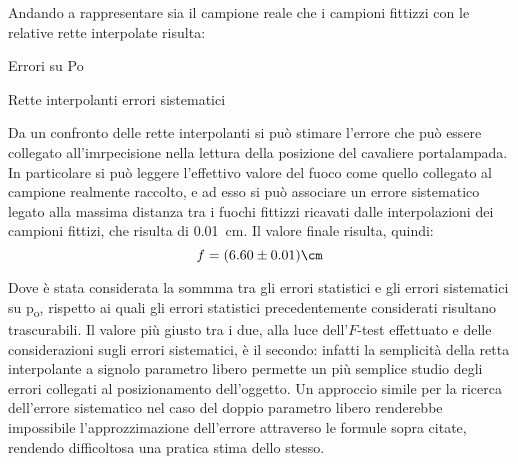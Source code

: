 Andando a rappresentare sia il campione reale che i campioni fittizzi con le relative rette interpolate risulta:
\begin{grafico} \centering  \caption{Errori su Po} \label{gr:02_graph_4.tex} \end{grafico}
\begin{tabella}
	\centering
	
	\caption{Rette interpolanti errori sistematici}
	\label{tab:02tab6}
\end{tabella}
Da un confronto delle rette interpolanti si può stimare l'errore che può essere collegato all'imrpecisione nella lettura della
 posizione del cavaliere portalampada. In particolare si può leggere l'effettivo valore del fuoco come quello collegato al
 campione realmente raccolto, e ad esso si può associare un errore sistematico legato alla massima distanza tra i fuochi fittizzi
 ricavati dalle interpolazioni dei campioni fittizi, che risulta di 0.01~cm. Il valore finale risulta, quindi:
\[f = (6.60 \pm 0.01) \cm\]

Dove è stata considerata la sommma tra gli errori statistici e gli errori sistematici su p\textsubscript{o}, rispetto ai quali gli
 errori statistici precedentemente considerati risultano trascurabili.
 Il valore più giusto tra i due, alla luce dell'$F$-test effettuato e delle considerazioni sugli errori sistematici, è il secondo:
 infatti la semplicità della retta interpolante a signolo parametro libero permette un più semplice studio degli errori collegati
 al posizionamento dell'oggetto. Un approccio simile per la ricerca dell'errore sistematico nel caso del doppio parametro libero
 renderebbe impossibile l'approzzimazione dell'errore attraverso le formule sopra citate, rendendo difficoltosa una pratica stima
 dello stesso.



